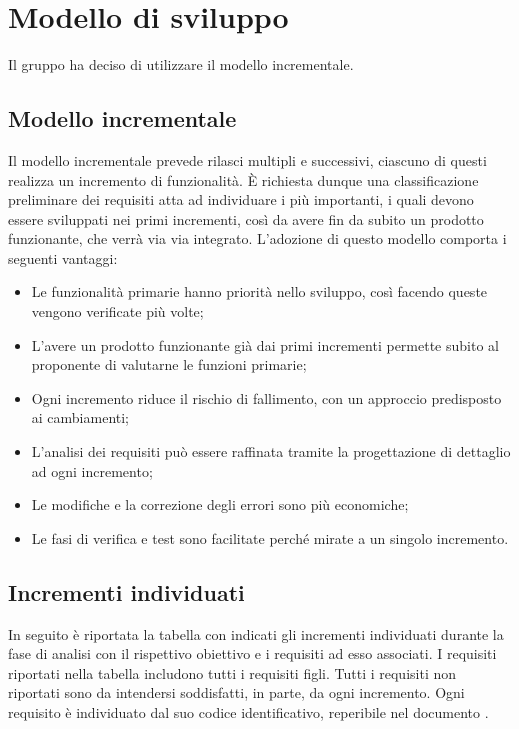 \section{Modello di sviluppo}
Il gruppo ha deciso di utilizzare il modello incrementale.
\subsection{Modello incrementale}
Il modello incrementale prevede rilasci multipli e successivi, ciascuno di questi realizza un incremento di funzionalità.
È richiesta dunque una classificazione preliminare dei requisiti atta ad individuare i più importanti, i quali devono essere sviluppati nei primi incrementi, così da avere fin da subito un prodotto funzionante, che verrà via via integrato.
L'adozione di questo modello comporta i seguenti vantaggi:
\begin{itemize}
\item Le funzionalità primarie hanno priorità nello sviluppo, così facendo queste vengono verificate più volte;
\item L'avere un prodotto funzionante già dai primi incrementi permette subito al proponente di valutarne le funzioni primarie;
\item Ogni incremento riduce il rischio di fallimento, con un approccio predisposto ai cambiamenti;
\item L'analisi dei requisiti può essere raffinata tramite la progettazione di dettaglio ad ogni incremento;
\item Le modifiche e la correzione degli errori sono più economiche;
\item Le fasi di verifica e test sono facilitate perché mirate a un singolo incremento.
\end{itemize}
\subsection{Incrementi individuati}
In seguito è riportata la tabella con indicati gli incrementi individuati durante la fase di analisi con il rispettivo obiettivo e i requisiti ad esso associati.
I requisiti riportati nella tabella includono tutti i requisiti figli. Tutti i requisiti non riportati sono da intendersi soddisfatti, in parte, da ogni incremento.
Ogni requisito è individuato dal suo codice identificativo, reperibile nel documento \AdRv{}.

